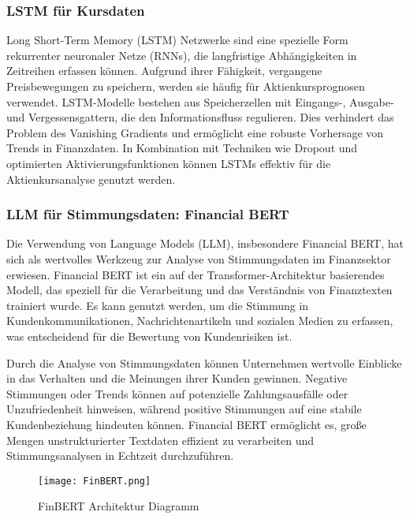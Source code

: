 \autocite{chollet2017deep}
\autocite{brownlee2018deep}
\autocite{abiodun2019comprehensive}

\subsubsection{LSTM für Kursdaten}\label{sec:lstm-kursdaten}

Long Short-Term Memory (LSTM) Netzwerke sind eine spezielle Form rekurrenter neuronaler Netze (RNNs), die langfristige Abhängigkeiten in Zeitreihen erfassen können. Aufgrund ihrer Fähigkeit, vergangene Preisbewegungen zu speichern, werden sie häufig für Aktienkursprognosen verwendet. LSTM-Modelle bestehen aus Speicherzellen mit Eingangs-, Ausgabe- und Vergessensgattern, die den Informationsfluss regulieren. Dies verhindert das Problem des Vanishing Gradients und ermöglicht eine robuste Vorhersage von Trends in Finanzdaten. In Kombination mit Techniken wie Dropout und optimierten Aktivierungsfunktionen können LSTMs effektiv für die Aktienkursanalyse genutzt werden.

\autocite{hochreiter1997long}
\autocite{fischer2018deep}
\autocite{siami2019performance}

\subsubsection{LLM für Stimmungsdaten: Financial BERT}

Die Verwendung von Language Models (LLM), insbesondere Financial BERT, hat sich als wertvolles Werkzeug zur Analyse von Stimmungsdaten im Finanzsektor erwiesen. Financial BERT ist ein auf der Transformer-Architektur basierendes Modell, das speziell für die Verarbeitung und das Verständnis von Finanztexten trainiert wurde. Es kann genutzt werden, um die Stimmung in Kundenkommunikationen, Nachrichtenartikeln und sozialen Medien zu erfassen, was entscheidend für die Bewertung von Kundenrisiken ist.

Durch die Analyse von Stimmungsdaten können Unternehmen wertvolle Einblicke in das Verhalten und die Meinungen ihrer Kunden gewinnen. Negative Stimmungen oder Trends können auf potenzielle Zahlungsausfälle oder Unzufriedenheit hinweisen, während positive Stimmungen auf eine stabile Kundenbeziehung hindeuten können. Financial BERT ermöglicht es, große Mengen unstrukturierter Textdaten effizient zu verarbeiten und Stimmungsanalysen in Echtzeit durchzuführen.

\begin{figure}[h]
	\centering
	\texttt{[image: FinBERT.png]}
	\caption{FinBERT Architektur Diagramm}
	\label{fig:finbert_architecture}
\end{figure}

